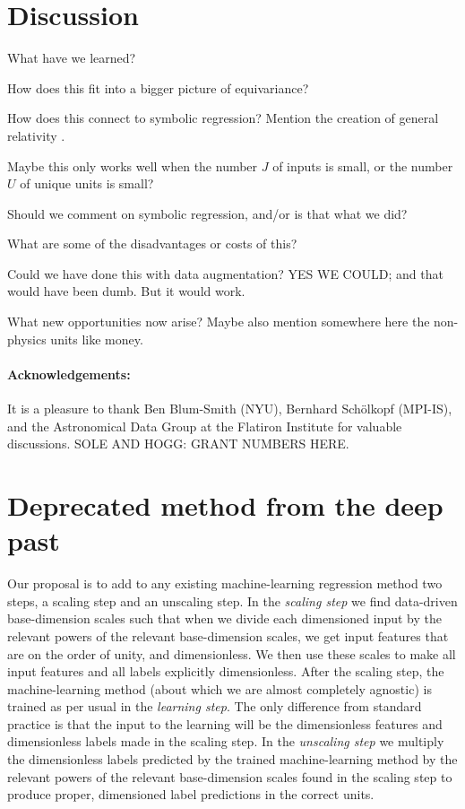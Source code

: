 \documentclass[12pt, letterpaper]{article}
\begin{document}
\section{Discussion}\label{sec:discussion}

What have we learned?

How does this fit into a bigger picture of equivariance?

How does this connect to symbolic regression? Mention the creation of general relativity \cite{norton}.

Maybe this only works well when the number $J$ of inputs is small, or the number $U$ of unique units is small?

Should we comment on symbolic regression, and/or is that what we did?

What are some of the disadvantages or costs of this?

Could we have done this with data augmentation? YES WE COULD; and that would have been dumb. But it would work.

What new opportunities now arise? Maybe also mention somewhere here the non-physics units like money.

\paragraph{Acknowledgements:}
It is a pleasure to thank
Ben Blum-Smith (NYU),
Bernhard Sch\"olkopf (MPI-IS),
and the Astronomical Data Group at the Flatiron Institute for valuable discussions.
SOLE AND HOGG: GRANT NUMBERS HERE.




\appendix
\section{Deprecated method from the deep past}
Our proposal is to add to any existing machine-learning regression method two steps, a scaling step and an unscaling step.
In the \emph{scaling step} we find data-driven base-dimension scales such that when we divide each dimensioned input by the relevant powers of the relevant base-dimension scales, we get input features that are on the order of unity, and dimensionless.
We then use these scales to make all input features and all labels explicitly dimensionless.
After the scaling step, the machine-learning method (about which we are almost completely agnostic) is trained as per usual in the \emph{learning step}.
The only difference from standard practice is that the input to the learning will be the dimensionless features and dimensionless labels made in the scaling step.
In the \emph{unscaling step} we multiply the dimensionless labels predicted by the trained machine-learning method by the relevant powers of the relevant base-dimension scales found in the scaling step to produce proper, dimensioned label predictions in the correct units.
\end{document}
